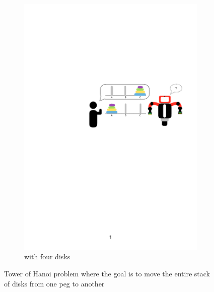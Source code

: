 \begin{figure}[htp]
\begin{subfigure}[t]{0.45\textwidth}
	\includegraphics[width=\textwidth]{figures/hanoi-1}
	\caption{with four disks}
	\label{fig:Tower of Hanoi 4}
\end{subfigure}
	
	\caption{Tower of Hanoi problem where the goal is to move the entire stack of disks from one peg to another}
	\label{fig:Tower of Hanoi}
\end{figure}

